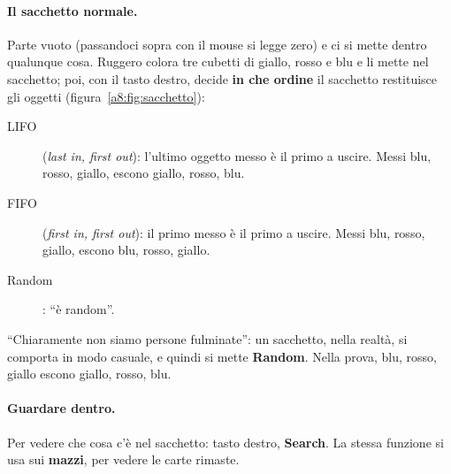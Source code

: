 \paragraph{Il sacchetto normale.} Parte vuoto (passandoci sopra con il mouse si legge
zero) e ci si mette dentro qualunque cosa. Ruggero colora tre cubetti di giallo, rosso
e blu e li mette nel sacchetto; poi, con il tasto destro, decide \textbf{in che ordine}
il sacchetto restituisce gli oggetti (figura~\ref{a8:fig:sacchetto}):
\begin{description}
  \item[LIFO] (\emph{last in, first out}): l'ultimo oggetto messo è il primo a
        uscire. Messi blu, rosso, giallo, escono giallo, rosso, blu.
  \item[FIFO] (\emph{first in, first out}): il primo messo è il primo a uscire.
        Messi blu, rosso, giallo, escono blu, rosso, giallo.
  \item[Random]: ``è random''.
\end{description}
``Chiaramente non siamo persone fulminate'': un sacchetto, nella realtà, si comporta in
modo casuale, e quindi si mette \textbf{Random}. Nella prova, blu, rosso, giallo escono
giallo, rosso, blu.

\paragraph{Guardare dentro.} Per vedere che cosa c'è nel sacchetto: tasto destro,
\textbf{Search}. La stessa funzione si usa sui \textbf{mazzi}, per vedere le carte
rimaste.

